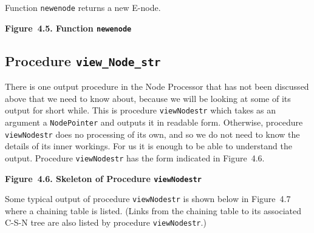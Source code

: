 \documentclass{article}
\begin{document}
Function \texttt{newenode} returns a new E-node.

\bigbreak
\begin{minipage}{\textwidth}
\vbox{}
\bigbreak
{}
\textbf{Figure~4.5. Function \texttt{newenode}}
\end{minipage}
\bigbreak


\subsection{Procedure \textbf{\texttt{view\_Node\_str}}}

There is one output procedure in the Node Processor that has not
been discussed above that we need to know about, because we will
be looking at some of its output for short while. This is
procedure \texttt{viewNodestr} which takes as an argument a
\texttt{NodePointer} and outputs it in readable form.
Otherwise, procedure \texttt{viewNodestr} does no processing of its
own, and so we do not need to know the details of its inner
workings. For us it is enough to be able to understand the
output. Procedure \texttt{viewNodestr} has the form indicated in
Figure~4.6.

\bigbreak
\begin{minipage}{\textwidth}
\vbox{}
\bigbreak
{}
\textbf{Figure~4.6. Skeleton of Procedure \texttt{viewNodestr}}
\end{minipage}
\bigbreak

Some typical output of procedure \texttt{viewNodestr} is shown
below in Figure~4.7 where a chaining table is listed.  (Links
from the chaining table to its associated C-S-N tree are also
listed by procedure \texttt{viewNodestr}.)
\end{document}
